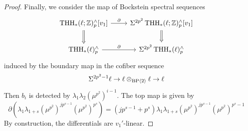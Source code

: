 \begin{proof}

Finally, we consider the map of Bockstein spectral sequences
\[ 
\begin{tikzcd}
\THH_*(\ell;\mathbb{Z})_p^{\wedge}[v_1] \ar[r,"\partial"] \arrow[Rightarrow,d] & \Sigma^{2p^2}\THH_*(\ell;\mathbb{Z})_p^{\wedge}[v_1]  \arrow[Rightarrow,d]  \\ 
\THH_*(\ell)_p^{\wedge} \ar[r,"\partial"] & \Sigma^{2p^2}\THH_*(\ell)_p^{\wedge} 
\end{tikzcd}
\]
induced by the boundary map in the cofiber sequence
\[ 
\Sigma^{2p^2-1}\ell \to \ell\otimes_{\mathrm{BP}\langle 2\rangle}\ell \to \ell \]
Then $b_i$ is detected by $\lambda_1\lambda_2(\mu^{p^2})^{i-1}$. The top map is given by 
\[ 
\partial(\lambda_1\lambda_{1+s}(\mu^{p^2})^{jp^{s-1}}(\mu^{p^2})^{p^s})=(jp^{s-1}+p^s)\lambda_1\lambda_{1+s}(\mu^{p^2})^{jp^{s-1}}(\mu^{p^2})^{p^s-1} 
\]
By construction, the differentials are $v_1'$-linear. 
\end{proof}

